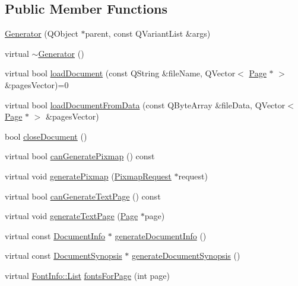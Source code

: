 \subsection*{Public Member Functions}
\begin{DoxyCompactItemize}
\item 
\hyperlink{classOkular_1_1Generator_a9a493b3f23f5d8b34eae9fa7231556f6}{Generator} (Q\+Object $\ast$parent, const Q\+Variant\+List \&args)
\item 
virtual \hyperlink{classOkular_1_1Generator_acc85fbe22690003267ba899bacf777d1}{$\sim$\+Generator} ()
\item 
virtual bool \hyperlink{classOkular_1_1Generator_a388b47328a5297d53cdbdc6fcf074ee3}{load\+Document} (const Q\+String \&file\+Name, Q\+Vector$<$ \hyperlink{classOkular_1_1Page}{Page} $\ast$ $>$ \&pages\+Vector)=0
\item 
virtual bool \hyperlink{classOkular_1_1Generator_ad65d9a0e78c500475bb403ab0ffd640c}{load\+Document\+From\+Data} (const Q\+Byte\+Array \&file\+Data, Q\+Vector$<$ \hyperlink{classOkular_1_1Page}{Page} $\ast$ $>$ \&pages\+Vector)
\item 
bool \hyperlink{classOkular_1_1Generator_a53fb0b9aa1b38bbc765dc83480fef918}{close\+Document} ()
\item 
virtual bool \hyperlink{classOkular_1_1Generator_abbf00927221e2d2b2b71101f2b7f5732}{can\+Generate\+Pixmap} () const 
\item 
virtual void \hyperlink{classOkular_1_1Generator_a198cdcd9c27b179562c935342fd457b6}{generate\+Pixmap} (\hyperlink{classOkular_1_1PixmapRequest}{Pixmap\+Request} $\ast$request)
\item 
virtual bool \hyperlink{classOkular_1_1Generator_a1f41d315daa0d2bd6831e0e7cd48d762}{can\+Generate\+Text\+Page} () const 
\item 
virtual void \hyperlink{classOkular_1_1Generator_a1e2d8c81ac97ec012098c09047d2ddef}{generate\+Text\+Page} (\hyperlink{classOkular_1_1Page}{Page} $\ast$page)
\item 
virtual const \hyperlink{classOkular_1_1DocumentInfo}{Document\+Info} $\ast$ \hyperlink{classOkular_1_1Generator_a9993dd0a2415499e23d8394e7a447e98}{generate\+Document\+Info} ()
\item 
virtual const \hyperlink{classOkular_1_1DocumentSynopsis}{Document\+Synopsis} $\ast$ \hyperlink{classOkular_1_1Generator_a1f8b31c19d7a5101cadf3fe3186ab0f1}{generate\+Document\+Synopsis} ()
\item 
virtual \hyperlink{classOkular_1_1FontInfo_ada799641ba87703c808645f57fdfafaa}{Font\+Info\+::\+List} \hyperlink{classOkular_1_1Generator_a75ae286341000fb8f30d383d42760ac2}{fonts\+For\+Page} (int page)

\end{DoxyCompactItemize}
